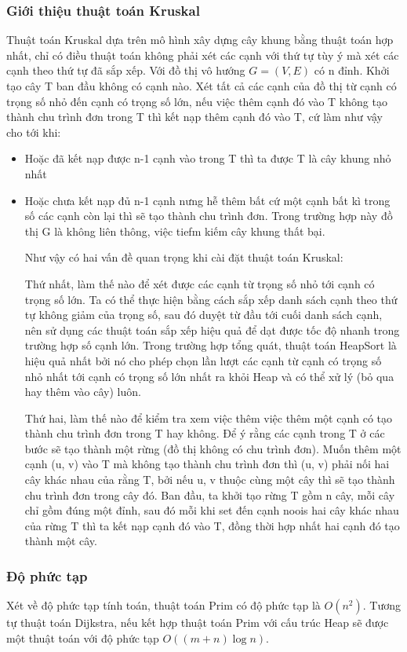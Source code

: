 \documentclass[a4paper,10pt]{article}
\begin{document}
\subsubsection{Giới thiệu thuật toán Kruskal}
Thuật toán Kruskal dựa trên mô hình xây dựng cây khung bằng thuật toán hợp nhất, chỉ có điều thuật toán không phải xét các cạnh với thứ tự tùy ý mà xét các cạnh theo thứ tự đã sắp xếp. Với đồ thị vô hướng $G = (V, E)$ có n đỉnh. Khởi tạo cây T ban đầu không có cạnh nào. Xét tất cả các cạnh của đồ thị từ cạnh có trọng số nhỏ đến cạnh có trọng số lớn, nếu việc thêm cạnh đó vào T không tạo thành chu trình đơn trong T thì kết nạp thêm cạnh đó vào T, cứ làm như vậy cho tới khi:
\begin{itemize}
\item Hoặc đã kết nạp được n-1 cạnh vào trong T thì ta được T là cây khung nhỏ nhất
\item Hoặc chưa kết nạp đủ n-1 cạnh nưng hễ thêm bất cứ một cạnh bất kì trong số các cạnh còn lại thì sẽ tạo thành chu trình đơn. Trong trường hợp này đồ thị G là không liên thông, việc tiefm kiếm cây khung thất bại.

Như vậy có hai vấn đề quan trọng khi cài đặt thuật toán Kruskal:

Thứ nhất, làm thế nào để xét được các cạnh từ trọng số nhỏ tới cạnh có trọng số lớn. Ta có thể thực hiện bằng cách sắp xếp danh sách cạnh theo thứ tự không giảm của trọng số, sau đó duyệt từ đầu tới cuối danh sách cạnh, nên sử dụng các thuật toán sắp xếp hiệu quả để dạt được tốc độ nhanh trong trường hợp số cạnh lớn. Trong trường hợp tổng quát, thuật toán HeapSort là hiệu quả nhất bởi nó cho phép chọn lần lượt các cạnh từ cạnh có trọng số nhỏ nhất tới cạnh có trọng số lớn nhất ra khỏi Heap và có thể xử lý (bỏ qua hay thêm vào cây) luôn.

Thứ hai, làm thế nào để kiểm tra xem việc thêm việc thêm một cạnh có tạo thành chu trình đơn trong T hay không. Để ý rằng các cạnh trong T ở các bước sẽ tạo thành một rừng (đồ thị không có chu trình đơn). Muốn thêm một cạnh (u, v) vào T mà không tạo thành chu trình đơn thì (u, v) phải nối hai cây khác nhau của rằng T, bởi nếu u, v thuộc cùng một cây thì sẽ tạo thành chu trình đơn trong cây đó. Ban đầu, ta khởi tạo rừng T gồm n cây, mỗi cây chỉ gồm đúng một đỉnh, sau đó mỗi khi set đến cạnh noois hai cây khác nhau của rừng T thì ta kết nạp cạnh đó vào T, đồng thời hợp nhất hai cạnh đó tạo thành một cây.
\end{itemize}
\subsubsection{Độ phức tạp}
Xét về độ phức tạp tính toán, thuật toán Prim có độ phức tạp là $O(n^2)$. Tương tự thuật toán Dijkstra, nếu kết hợp thuật toán Prim với cấu trúc Heap sẽ được một thuật toán với độ phức tạp $O((m+n) \log n)$.
\end{document}
